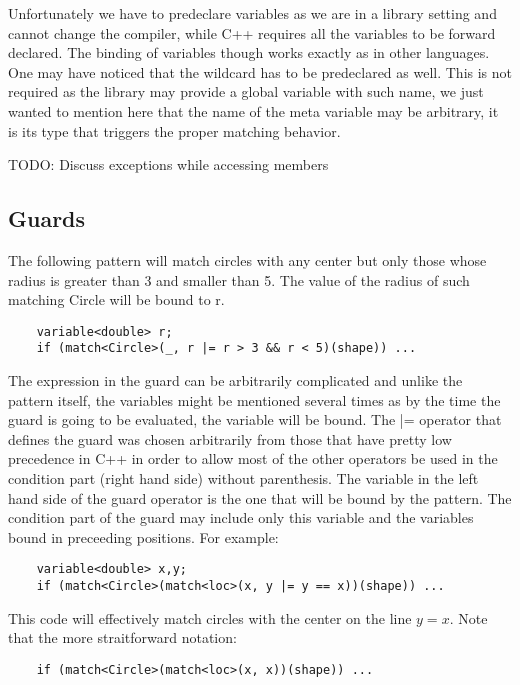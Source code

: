 \documentclass[submission,copyright]{eptcs}
\begin{document}
Unfortunately we have to predeclare variables as we are in a library setting and 
cannot change the compiler, while C++ requires all the variables to be forward 
declared. The binding of variables though works exactly as in other languages. 
One may have noticed that the wildcard has to be predeclared as well. This is 
not required as the library may provide a global variable with such name, we 
just wanted to mention here that the name of the meta variable may be arbitrary, 
it is its type that triggers the proper matching behavior.

TODO: Discuss exceptions while accessing members

\subsection{Guards}

The following pattern will match circles with any center but only those whose 
radius is greater than 3 and smaller than 5. The value of the radius of such 
matching Circle will be bound to r.

\begin{lstlisting}
    variable<double> r;
    if (match<Circle>(_, r |= r > 3 && r < 5)(shape)) ...
\end{lstlisting}

The expression in the guard can be arbitrarily complicated and unlike the 
pattern itself, the variables might be mentioned several times as by the time 
the guard is going to be evaluated, the variable will be bound. The |= operator 
that defines the guard was chosen arbitrarily from those that have pretty low 
precedence in C++ in order to allow most of the other operators be used in the 
condition part (right hand side) without parenthesis. The variable in the left 
hand side of the guard operator is the one that will be bound by the pattern. 
The condition part of the guard may include only this variable and the variables 
bound in preceeding positions. For example:

\begin{lstlisting}
    variable<double> x,y;
    if (match<Circle>(match<loc>(x, y |= y == x))(shape)) ...
\end{lstlisting}

This code will effectively match circles with the center on the line $y=x$. Note 
that the more straitforward notation:

\begin{lstlisting}
    if (match<Circle>(match<loc>(x, x))(shape)) ...
\end{lstlisting}
\end{document}
